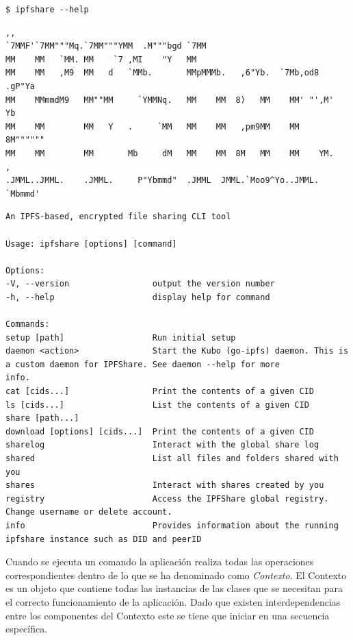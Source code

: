 \begin{verbatim}
$ ipfshare --help
\end{verbatim}
\begin{verbatim}
,,
`7MMF'`7MM"""Mq.`7MM"""YMM  .M"""bgd `7MM
MM    MM   `MM. MM    `7 ,MI    "Y   MM
MM    MM   ,M9  MM   d   `MMb.       MMpMMMb.   ,6"Yb.  `7Mb,od8 .gP"Ya
MM    MMmmdM9   MM""MM     `YMMNq.   MM    MM  8)   MM    MM' "',M'   Yb
MM    MM        MM   Y   .     `MM   MM    MM   ,pm9MM    MM    8M""""""
MM    MM        MM       Mb     dM   MM    MM  8M   MM    MM    YM.    ,
.JMML..JMML.    .JMML.     P"Ybmmd"  .JMML  JMML.`Moo9^Yo..JMML.   `Mbmmd'
\end{verbatim}
\begin{verbatim}
An IPFS-based, encrypted file sharing CLI tool

Usage: ipfshare [options] [command]

Options:
-V, --version                 output the version number
-h, --help                    display help for command

Commands:
setup [path]                  Run initial setup
daemon <action>               Start the Kubo (go-ipfs) daemon. This is a custom daemon for IPFShare. See daemon --help for more
info.
cat [cids...]                 Print the contents of a given CID
ls [cids...]                  List the contents of a given CID
share [path...]
download [options] [cids...]  Print the contents of a given CID
sharelog                      Interact with the global share log
shared                        List all files and folders shared with you
shares                        Interact with shares created by you
registry                      Access the IPFShare global registry. Change username or delete account.
info                          Provides information about the running ipfshare instance such as DID and peerID

\end{verbatim}


Cuando se ejecuta un comando la aplicación realiza todas las operaciones correspondientes dentro de lo que se ha denominado como \textit{Contexto}. El Contexto es un objeto que contiene todas las instancias de las clases que se necesitan para el correcto funcionamiento de la aplicación. Dado que existen interdependencias entre los componentes del Contexto este se tiene que iniciar en una secuencia específica.

